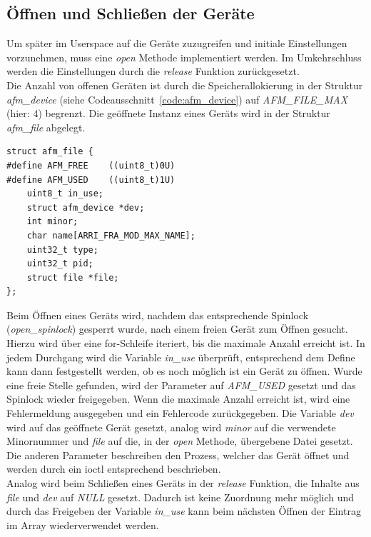 \subsection{Öffnen und Schließen der Geräte}
Um später im Userspace auf die Geräte zuzugreifen und initiale Einstellungen vorzunehmen, muss eine \textit{open} Methode implementiert werden. Im Umkehrschluss werden die Einstellungen durch die \textit{release} Funktion zurückgesetzt. \cite[Seite 58f.]{corbet2005linux} \\

Die Anzahl von offenen Geräten ist durch die Speicherallokierung in der Struktur \textit{afm\_device} (siehe Codeausschnitt~\ref{code:afm_device}) auf \textit{AFM\_FILE\_MAX} (hier: 4) begrenzt. Die geöffnete Instanz eines Geräts wird in der Struktur \textit{afm\_file} abgelegt.

\begin{lstfloat}
\begin{lstlisting}
struct afm_file {  
#define AFM_FREE    ((uint8_t)0U)
#define AFM_USED    ((uint8_t)1U)
	uint8_t in_use;
	struct afm_device *dev;
	int minor;
	char name[ARRI_FRA_MOD_MAX_NAME];
	uint32_t type;
	uint32_t pid;
	struct file *file;
};
\end{lstlisting}
\end{lstfloat}

Beim Öffnen eines Geräts wird, nachdem das entsprechende Spinlock (\textit{open\_spinlock}) gesperrt wurde, nach einem freien Gerät zum Öffnen gesucht. Hierzu wird über eine for-Schleife iteriert, bis die maximale Anzahl erreicht ist. In jedem Durchgang wird die Variable \textit{in\_use} überprüft, entsprechend dem Define kann dann festgestellt werden, ob es noch möglich ist ein Gerät zu öffnen. Wurde eine freie Stelle gefunden, wird der Parameter auf \textit{AFM\_USED} gesetzt und das Spinlock wieder freigegeben.
Wenn die maximale Anzahl erreicht ist, wird eine Fehlermeldung ausgegeben und ein Fehlercode zurückgegeben.
Die Variable \textit{dev} wird auf das geöffnete Gerät gesetzt, analog wird \textit{minor} auf die verwendete Minornummer und \textit{file} auf die, in der \textit{open} Methode, übergebene Datei gesetzt. 
Die anderen Parameter beschreiben den Prozess, welcher das Gerät öffnet und werden durch ein \ac{ioctl} entsprechend beschrieben.\\

Analog wird beim Schließen eines Geräts in der \textit{release} Funktion, die Inhalte aus \textit{file} und \textit{dev} auf \textit{NULL} gesetzt. Dadurch ist keine Zuordnung mehr möglich und durch das Freigeben der Variable \textit{in\_use} kann beim nächsten Öffnen der Eintrag im Array wiederverwendet werden.


